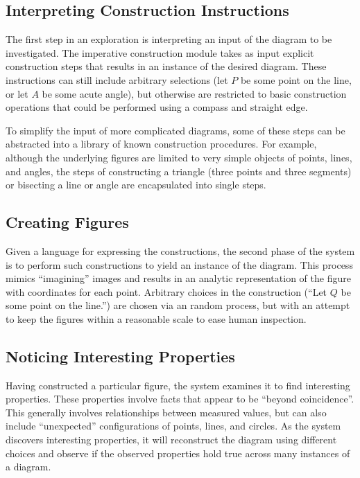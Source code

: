 \subsection{Interpreting Construction Instructions}

\enlargethispage*{\baselineskip}

The first step in an exploration is interpreting an input of the
diagram to be investigated.  The imperative construction module takes
as input explicit construction steps that results in an instance of
the desired diagram.  These instructions can still include arbitrary
selections (let $P$ be some point on the line, or let $A$ be some
acute angle), but otherwise are restricted to basic construction
operations that could be performed using a compass and straight edge.

To simplify the input of more complicated diagrams, some of these
steps can be abstracted into a library of known construction
procedures.  For example, although the underlying figures are limited
to very simple objects of points, lines, and angles, the steps of
constructing a triangle (three points and three segments) or bisecting
a line or angle are encapsulated into single steps.

\subsection{Creating Figures}

Given a language for expressing the constructions, the second phase of
the system is to perform such constructions to yield an instance of
the diagram.  This process mimics ``imagining'' images and results in
an analytic representation of the figure with coordinates for each
point.  Arbitrary choices in the construction (``Let $Q$ be some point
on the line.'') are chosen via an random process, but with an attempt
to keep the figures within a reasonable scale to ease human
inspection.

\subsection{Noticing Interesting Properties}
\label{sec:interest}

Having constructed a particular figure, the system examines it to find
interesting properties.  These properties involve facts that appear to
be ``beyond coincidence''.  This generally involves relationships
between measured values, but can also include ``unexpected''
configurations of points, lines, and circles.  As the system discovers
interesting properties, it will reconstruct the diagram using
different choices and observe if the observed properties hold true
across many instances of a diagram.

